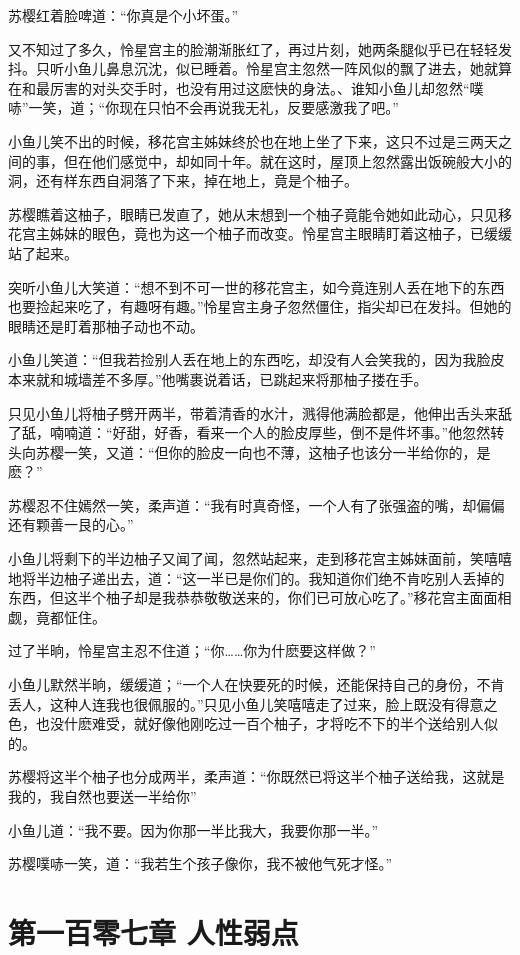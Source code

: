 \documentclass[12pt,oneside]{book}
\begin{document}
苏樱红着脸啤道：``你真是个小坏蛋。''

又不知过了多久，怜星宫主的脸潮渐胀红了，再过片刻，她两条腿似乎已在轻轻发抖。只听小鱼儿鼻息沉沈，似已睡着。怜星宫主忽然一阵风似的飘了进去，她就算在和最厉害的对头交手时，也没有用过这麽快的身法。、谁知小鱼儿却忽然``噗哧''一笑，道；``你现在只怕不会再说我无礼，反要感激我了吧。''

小鱼儿笑不出的时候，移花宫主姊妹终於也在地上坐了下来，这只不过是三两天之间的事，但在他们感觉中，却如同十年。就在这时，屋顶上忽然露出饭碗般大小的洞，还有样东西自洞落了下来，掉在地上，竟是个柚子。

苏樱瞧着这柚子，眼睛已发直了，她从末想到一个柚子竟能令她如此动心，只见移花宫主姊妹的眼色，竟也为这一个柚子而改变。怜星宫主眼睛盯着这柚子，已缓缓站了起来。

突听小鱼儿大笑道：``想不到不可一世的移花宫主，如今竟连别人丢在地下的东西也要捡起来吃了，有趣呀有趣。''怜星宫主身子忽然僵住，指尖却已在发抖。但她的眼睛还是盯着那柚子动也不动。

小鱼儿笑道：``但我若捡别人丢在地上的东西吃，却没有人会笑我的，因为我脸皮本来就和城墙差不多厚。''他嘴裹说着话，已跳起来将那柚子搂在手。

只见小鱼儿将柚子劈开两半，带着清香的水汁，溅得他满脸都是，他伸出舌头来舐了舐，喃喃道：``好甜，好香，看来一个人的脸皮厚些，倒不是件坏事。''他忽然转头向苏樱一笑，又道：``但你的脸皮一向也不薄，这柚子也该分一半给你的，是麽？''

苏樱忍不住嫣然一笑，柔声道：``我有时真奇怪，一个人有了张强盗的嘴，却偏偏还有颗善一艮的心。''

小鱼儿将剩下的半边柚子又闻了闻，忽然站起来，走到移花宫主姊妹面前，笑嘻嘻地将半边柚子递出去，道：``这一半已是你们的。我知道你们绝不肯吃别人丢掉的东西，但这半个柚子却是我恭恭敬敬送来的，你们已可放心吃了。''移花宫主面面相觑，竟都怔住。

过了半晌，怜星宫主忍不住道；``你\ldots\ldots 你为什麽要这样做？''

小鱼儿默然半晌，缓缓道；``一个人在快要死的时候，还能保持自己的身份，不肯丢人，这种人连我也很佩服的。''只见小鱼儿笑嘻嘻走了过来，脸上既没有得意之色，也没什麽难受，就好像他刚吃过一百个柚子，才将吃不下的半个送给别人似的。

苏樱将这半个柚子也分成两半，柔声道：``你既然已将这半个柚子送给我，这就是我的，我自然也要送一半给你''

小鱼儿道：``我不要。因为你那一半比我大，我要你那一半。''

苏樱噗哧一笑，道：``我若生个孩子像你，我不被他气死才怪。''

\hypertarget{ux7b2cux4e00ux767eux96f6ux4e03ux7ae0-ux4ebaux6027ux5f31ux70b9}{%
\chapter{第一百零七章
人性弱点}\label{ux7b2cux4e00ux767eux96f6ux4e03ux7ae0-ux4ebaux6027ux5f31ux70b9}}
\end{document}
